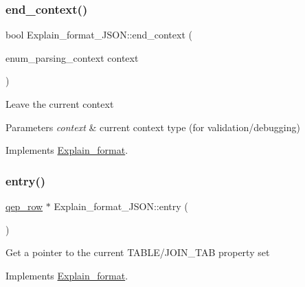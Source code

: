 \mbox{\label{classExplain__format__JSON_a6b44f355df4e59b3d33b6c334d8fda59}} 
\subsubsection{\texorpdfstring{end\+\_\+context()}{end\_context()}}
{\footnotesize\ttfamily bool Explain\+\_\+format\+\_\+\+J\+S\+O\+N\+::end\+\_\+context (\begin{DoxyParamCaption}\item[{enum\+\_\+parsing\+\_\+context}]{context }\end{DoxyParamCaption})\hspace{0.3cm}{\ttfamily [virtual]}}

Leave the current context


\begin{DoxyParams}{Parameters}
{\em context} & current context type (for validation/debugging) \\
\hline
\end{DoxyParams}


Implements \mbox{\hyperlink{classExplain__format_a3d668c297dd5fb8ae34b11fe89dfc02b}{Explain\+\_\+format}}.

\mbox{\label{classExplain__format__JSON_ab1c4bc5ad6055507a47057fe98ba55dc}} 
\subsubsection{\texorpdfstring{entry()}{entry()}}
{\footnotesize\ttfamily \mbox{\hyperlink{classqep__row}{qep\+\_\+row}} $\ast$ Explain\+\_\+format\+\_\+\+J\+S\+O\+N\+::entry (\begin{DoxyParamCaption}{ }\end{DoxyParamCaption})\hspace{0.3cm}{\ttfamily [virtual]}}

Get a pointer to the current T\+A\+B\+L\+E/\+J\+O\+I\+N\+\_\+\+T\+AB property set 

Implements \mbox{\hyperlink{classExplain__format_aa822adf89028df0cdb74d39065ee9e5a}{Explain\+\_\+format}}.

